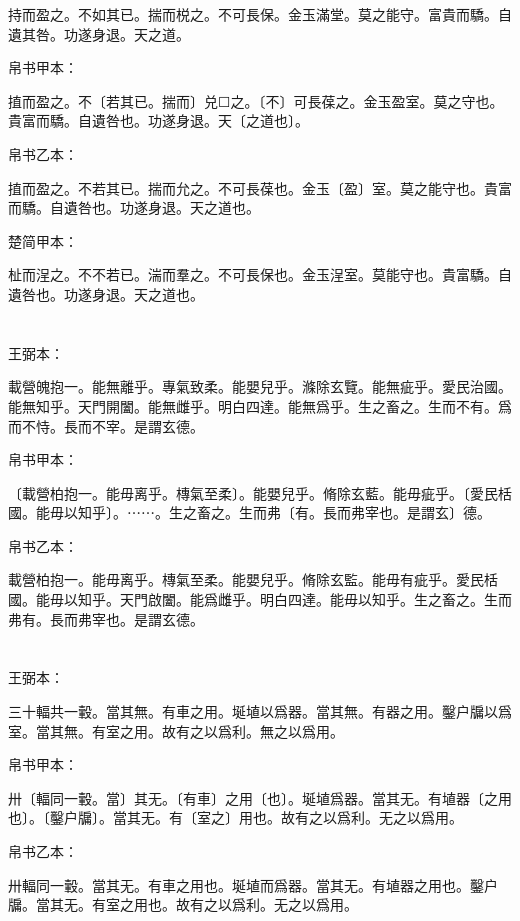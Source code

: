 \documentclass[a5paper]{ctexbook}
\begin{document}
    持而盈之。不如其已。揣而棁之。不可長保。金玉滿堂。莫之能守。富貴而驕。自遺其咎。功遂身退。天之道。

    
    帛书甲本：

    㨁而盈之。不〔若其已。揣而〕兑☐之。〔不〕可長葆之。金玉盈室。莫之守也。貴富而驕。自遺咎也。功遂身退。天〔之道也〕。

    帛书乙本：

    㨁而盈之。不若其已。揣而允之。不可長葆也。金玉〔盈〕室。莫之能守也。貴富而驕。自遺咎也。功遂身退。天之道也。

    楚简甲本：

    杫而浧之。不不若已。湍而羣之。不可長保也。金玉浧室。莫能守也。貴富驕。自遺咎也。功遂身退。天之道也。

    \chapter{}
    王弼本：

    載營魄抱一。能無離乎。專氣致柔。能嬰兒乎。滌除玄覽。能無疵乎。愛民治國。能無知乎。天門開闔。能無雌乎。明白四達。能無爲乎。生之畜之。生而不有。爲而不恃。長而不宰。是謂玄德。

    
    帛书甲本：

    〔載營柏抱一。能毋离乎。槫氣至柔〕。能嬰兒乎。脩除玄藍。能毋疵乎。〔愛民栝國。能毋以知乎〕。⋯⋯。生之畜之。生而弗〔有。長而弗宰也。是謂玄〕德。

    帛书乙本：

    載營柏抱一。能毋离乎。槫氣至柔。能嬰兒乎。脩除玄監。能毋有疵乎。愛民栝國。能毋以知乎。天門啟闔。能爲雌乎。明白四達。能毋以知乎。生之畜之。生而弗有。長而弗宰也。是謂玄德。

    \chapter{}
    王弼本：

    三十輻共一轂。當其無。有車之用。埏埴以爲器。當其無。有器之用。鑿户牖以爲室。當其無。有室之用。故有之以爲利。無之以爲用。

    
    帛书甲本：

    卅〔輻同一轂。當〕其无。〔有車〕之用〔也〕。埏埴爲器。當其无。有埴器〔之用也〕。〔鑿户牖〕。當其无。有〔室之〕用也。故有之以爲利。无之以爲用。

    帛书乙本：

    卅輻同一轂。當其无。有車之用也。埏埴而爲器。當其无。有埴器之用也。鑿户牖。當其无。有室之用也。故有之以爲利。无之以爲用。
\end{document}
